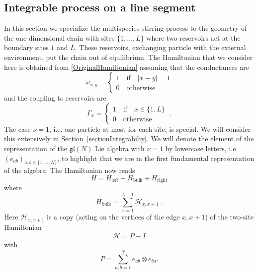 \documentclass[10pt]{article}
\numberwithin{equation}{section}
\numberwithin{equation}{subsection}
\newcommand{\id}{I}
\newcommand{\dt}{\;.}
\begin{document}
\subsection{Integrable process on a line segment}\label{subsection-description-process-LINE}
In this section we specialize the multispecies stirring process to the geometry of the one dimensional chain with sites $\{1,\ldots,L\}$ where two reservoirs act at the boundary sites $1$ and $L$. These reservoirs, exchanging particle with the external environment, put the chain out of equilibrium. The Hamiltonian that we consider here is obtained from \eqref{OriginalHamiltonian} assuming that the conductances are
\begin{equation}
	\omega_{x,y}=\begin{cases}
		1 \quad \text{if}\quad |x-y|=1\\
		0\quad \text{otherwise}
	\end{cases}
\end{equation}
and the coupling to reservoirs are
\begin{equation}
	\Gamma_{x}=\begin{cases}
		1\quad \text{if} \quad x\in \{1,L\}\\
		0\quad \text{otherwise}
	\end{cases}\dt
\end{equation}
The case $\nu=1$, i.e. one particle at most for each site, is special. We will consider this extensively in Section~\ref{sectionIntegrabiliy}.
We will denote the element of the representation of the $\mathfrak{gl}(N)$  Lie algebra with $\nu=1$ by lowercase letters, i.e. $(e_{ab})_{a,b\in\{1,\ldots,N\}}$, to highlight that we are in the first fundamental representation of the algebra.
The Hamiltonian now reads
\begin{equation}\label{hamiltonian}
	H=H_{\text{left}}+H_{\text{bulk}}+H_{\text{right}}
\end{equation}
where
\begin{equation}
	H_{\text{bulk}}=\sum_{x=1}^{L-1}\mathcal{H}_{x,x+1}\dt
\end{equation}
Here $\mathcal{H}_{x,x+1}$  is a copy (acting on the vertices of the edge $x,x+1$) of the two-site Hamiltonian
\begin{equation}\label{H-corsivo}
	\begin{split}
		\mathcal{H}=P-\id
	\end{split}
\end{equation}
with 
\begin{equation}
	P=\sum_{a,b=1}^Ne_{ab}\otimes e_{ba}.
\end{equation} 
\end{document}
